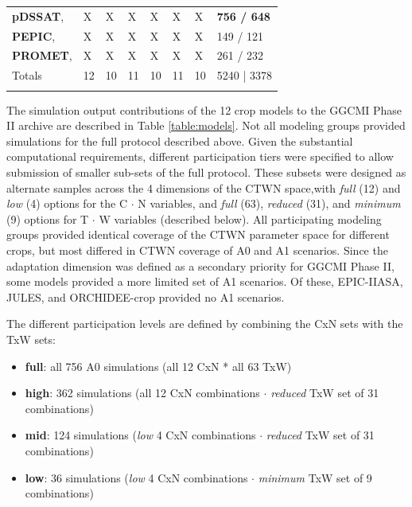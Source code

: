 \documentclass[gmd, manuscript]{copernicus} %
\begin{document}
\begin{table}[t]
\begin{tabular}{p{6cm} p{1cm} p{1cm} p{1cm} p{1cm} p{1cm} p{1cm} p{1.9cm}}
        {\textbf{pDSSAT},       \citet{Elliott2014b, JONES2003235}} & {X} & {X} & {X} & {X} & {X} & {X} & {\textbf{756 / 648}}\\ \middlehline
        {\textbf{PEPIC},        \citet{LIU2016164, LIU2016}}  & {X} & {X} & {X} & {X} & {X} & {X} & {149 / 121}\\ \middlehline
        {\textbf{PROMET},       \citet{Hank2015, MAUSER2015}} & {X} & {X} & {X} & {X} & {X} & {X} & {261 / 232}\\ \middlehline
        {Totals} & {12} & {10} & {11} & {10} & {11} & {10} & {5240 | 3378}\\
        \bottomhline
    \end{tabular}
\end{table}

The simulation output contributions of the 12 crop models to the GGCMI Phase II archive are described in Table \ref{table:models}.
Not all modeling groups provided simulations for the full protocol described above. 
Given the substantial computational requirements, different participation tiers were specified to allow submission of smaller sub-sets of the full protocol. 
These subsets were designed as alternate samples across the 4 dimensions of the CTWN space,with \textit{full} (12) and \textit{low} (4) options for the C $\cdot$ N variables, and \textit{full} (63), \textit{reduced} (31), and \textit{minimum} (9) options for T $\cdot$ W variables (described below). 
All participating modeling groups provided identical coverage of the CTWN parameter space for different crops, but most differed in CTWN coverage of A0 and A1 scenarios. Since the adaptation dimension was defined as a secondary priority for GGCMI Phase II, some models provided a more limited set of A1 scenarios. Of these, EPIC-IIASA, JULES, and ORCHIDEE-crop provided no A1 scenarios.

The different participation levels are defined by combining the CxN sets with the TxW sets:
\begin{itemize}
\item{\textbf{full}: all 756 A0 simulations (all 12 CxN * all 63 TxW)}
\item{\textbf{high}: 362 simulations (all 12 CxN combinations  $\cdot$ \textit{reduced} TxW set of 31 combinations)}
\item{\textbf{mid}: 124 simulations (\textit{low} 4 CxN combinations $\cdot$ \textit{reduced} TxW set of 31 combinations)}
\item{\textbf{low}: 36 simulations (\textit{low} 4 CxN combinations $\cdot$ \textit{minimum} TxW set of 9 combinations)}
\end{itemize}
\end{document}
